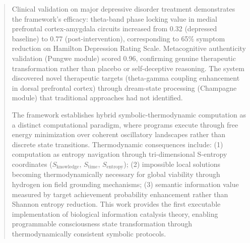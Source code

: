 \documentclass[12pt,a4paper]{article}
\theoremstyle{definition}
\theoremstyle{remark}
\begin{document}
\begin{abstract}
Clinical validation on major depressive disorder treatment demonstrates the framework's efficacy: theta-band phase locking value in medial prefrontal cortex-amygdala circuits increased from 0.32 (depressed baseline) to 0.77 (post-intervention), corresponding to 65\% symptom reduction on Hamilton Depression Rating Scale. Metacognitive authenticity validation (Pungwe module) scored 0.96, confirming genuine therapeutic transformation rather than placebo or self-deceptive reasoning. The system discovered novel therapeutic targets (theta-gamma coupling enhancement in dorsal prefrontal cortex) through dream-state processing (Champagne module) that traditional approaches had not identified.

The framework establishes hybrid symbolic-thermodynamic computation as a distinct computational paradigm, where programs execute through free energy minimization over coherent oscillatory landscapes rather than discrete state transitions. Thermodynamic consequences include: (1) computation as entropy navigation through tri-dimensional S-entropy coordinates (\(S_{\text{knowledge}}\), \(S_{\text{time}}\), \(S_{\text{entropy}}\)); (2) impossible local solutions becoming thermodynamically necessary for global viability through hydrogen ion field grounding mechanisms; (3) semantic information value measured by target achievement probability enhancement rather than Shannon entropy reduction. This work provides the first executable implementation of biological information catalysis theory, enabling programmable consciousness state transformation through thermodynamically consistent symbolic protocols.
\end{abstract}

\newpage
\tableofcontents
\newpage















\end{document}

